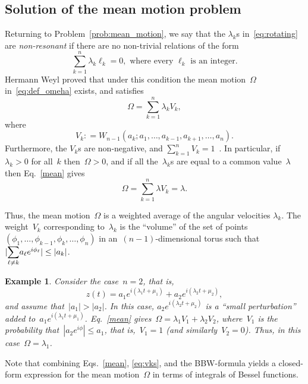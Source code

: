 \documentclass[final ]{IEEEtran}
\newtheorem{example}{Example}
\newcommand{\be}{\begin{equation}}
\newcommand{\ee}{\end{equation}}
\begin{document}
\subsection{Solution of the mean motion problem}
Returning to Problem~\ref{prob:mean_motion}, 
  we say that the $\lambda_k$s in~\eqref{eq:rotating}
  are
  \emph{non-resonant}
  if there  are no non-trivial relations of the form 
  \be\label{eq:non_rse}
  \sum_{k=1}^n  \lambda_k \ell_k=0, \text{ where every }
\ell_k \text{ is an  integer}.
\ee
 Hermann Weyl \cite{Weyl_meanmotion} proved that under this condition the mean motion~$\Omega$ in~\eqref{eq:def_omeha}   exists, and satisfies
  \begin{equation}\label{mean}
\Omega=\sum_{k=1}^n \lambda_k V_k ,
\end{equation}
where
\be\label{eq:vks}
V_k : =W_{n-1}(a_k;a_1,\dots,a_{k-1},a_{k+1},\dots,a_n).
\ee
Furthermore,
the  $V_k$s  are non-negative, and $\sum_{k=1}^n V_k=1$~\cite{Weyl_meanmotion}.
In particular, if~$\lambda_k>0$ for all~$k$ then~$\Omega>0$, and if   all the~$\lambda_k$s are equal to a common value~$\lambda$ then Eq.~\eqref{mean} gives
\[ \Omega=\sum_{k=1}^n \lambda V_k=\lambda.
\]


Thus, the mean motion~$\Omega$ is a weighted  average of  the angular velocities $\lambda_k$.
The weight~$V_k$
corresponding to~$\lambda_k$
is  the ``volume''  of the set of points~$(\phi_1,\dots,\phi_{k-1},\phi_{k},\dots,\phi_n)$
in an~$(n-1)$-dimensional torus
such that~$   | {\displaystyle
\sum _{   %
\ell \not = k}  }%
a_\ell e^{i\phi_\ell} |\leq |a_k|$.

\begin{example}
    Consider the case~$n=2$, that is,
    \[
    z(t)=a_1 e^{i(\lambda_1 t+ \mu_1) } +a_2 e^{ i(\lambda_2 t+ \mu_2) },
    \]
    and assume that~$|a_1|>|a_2|$. In this case, $a_2 e^{i(\lambda_2 t+ \mu_2) }$ is a ``small perturbation'' added to~$a_1 e^{i(\lambda_1 t+ \mu_1) }$.
  Eq.~\eqref{mean} gives~$\Omega=\lambda_1 V_1+\lambda_2 V_2$, where~$V_1$ is the
  probability that~$|a_2e^{i \phi}|\leq a_1$, that is,~$V_1=1$ (and similarly~$V_2=0$). Thus, in this case~$\Omega=\lambda_1$. 
\end{example}

 
 Note that combining
 Eqs.~\eqref{mean}, \eqref{eq:vks},
 and the BBW-formula
 yields
 a closed-form  expression for the mean motion~$\Omega$
 in terms of  integrals of  Bessel functions.
\end{document}
